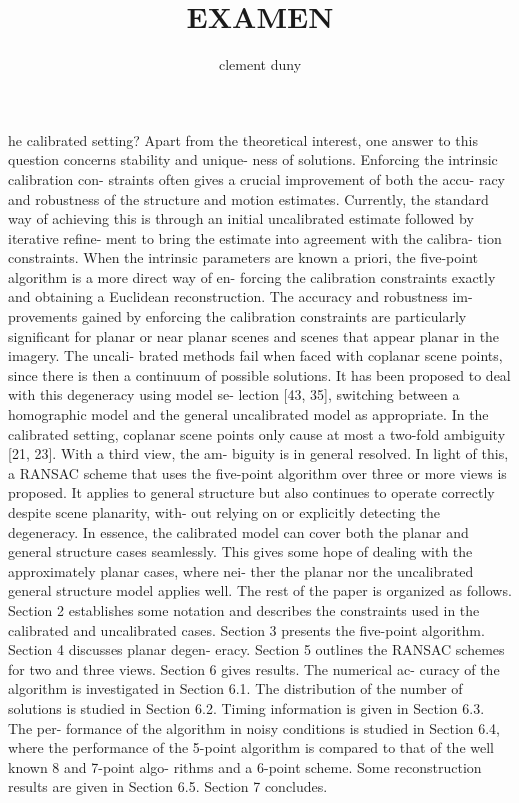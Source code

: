 \documentclass[10pt,twocolumn,letterpaper]{article}
\begin{document}
\nocite{*}

\title{EXAMEN}
\author{clement duny }
\maketitle

he calibrated setting? Apart from the theoretical interest,
one answer to this question concerns stability and unique-
ness of solutions. Enforcing the intrinsic calibration con-
straints often gives a crucial improvement of both the accu-
racy and robustness of the structure and motion estimates.
Currently, the standard way of achieving this is through
an initial uncalibrated estimate followed by iterative refine-
ment to bring the estimate into agreement with the calibra-
tion constraints. When the intrinsic parameters are known
a priori, the five-point algorithm is a more direct way of en-
forcing the calibration constraints exactly and obtaining a
Euclidean reconstruction. The accuracy and robustness im-
provements gained by enforcing the calibration constraints
are particularly significant for planar or near planar scenes
and scenes that appear planar in the imagery. The uncali-
brated methods fail when faced with coplanar scene points,
since there is then a continuum of possible solutions. It has
been proposed to deal with this degeneracy using model se-
lection [43, 35], switching between a homographic model
and the general uncalibrated model as appropriate. In the
calibrated setting, coplanar scene points only cause at most
a two-fold ambiguity [21, 23]. With a third view, the am-
biguity is in general resolved. In light of this, a RANSAC
scheme that uses the five-point algorithm over three or more
views is proposed. It applies to general structure but also
continues to operate correctly despite scene planarity, with-
out relying on or explicitly detecting the degeneracy. In
essence, the calibrated model can cover both the planar and
general structure cases seamlessly. This gives some hope
of dealing with the approximately planar cases, where nei-
ther the planar nor the uncalibrated general structure model
applies well.
The rest of the paper is organized as follows. Section 2
establishes some notation and describes the constraints used
in the calibrated and uncalibrated cases. Section 3 presents
the five-point algorithm. Section 4 discusses planar degen-
eracy. Section 5 outlines the RANSAC schemes for two
and three views. Section 6 gives results. The numerical ac-
curacy of the algorithm is investigated in Section 6.1. The
distribution of the number of solutions is studied in Section
6.2. Timing information is given in Section 6.3. The per-
formance of the algorithm in noisy conditions is studied in
Section 6.4, where the performance of the 5-point algorithm
is compared to that of the well known 8 and 7-point algo-
rithms and a 6-point scheme. Some reconstruction results
are given in Section 6.5. Section 7 concludes.
\end{document}
